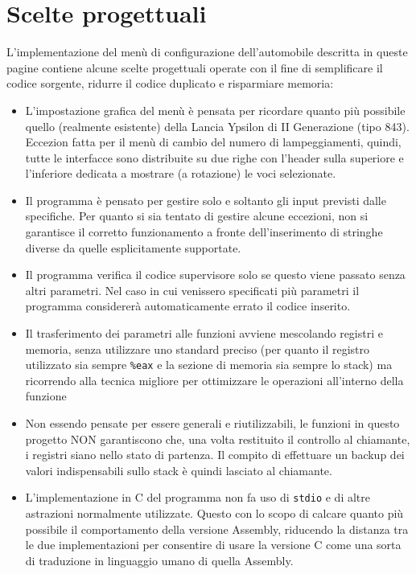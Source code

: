 \documentclass[
  12pt,
  a4paper,
  headings=optiontoheadandtoc
]{scrreprt}
\begin{document}
\chapter[nonumber=true]{Scelte progettuali}

L'implementazione del menù di configurazione dell'automobile descritta in queste pagine contiene alcune scelte progettuali operate con il fine di semplificare il codice sorgente, ridurre il codice duplicato e risparmiare memoria:

\begin{itemize}
\item L'impostazione grafica del menù è pensata per ricordare quanto più possibile quello (realmente esistente) della Lancia Ypsilon di II Generazione (tipo 843). Eccezion fatta per il menù di cambio del numero di lampeggiamenti, quindi, tutte le interfacce sono distribuite su due righe con l'header sulla superiore e l'inferiore dedicata a mostrare (a rotazione) le voci selezionate.
\item Il programma è pensato per gestire solo e soltanto gli input previsti dalle specifiche. Per quanto si sia tentato di gestire alcune eccezioni, non si garantisce il corretto funzionamento a fronte dell'inserimento di stringhe diverse da quelle esplicitamente supportate.
\item Il programma verifica il codice supervisore solo se questo viene passato senza altri parametri. Nel caso in cui venissero specificati più parametri il programma considererà automaticamente errato il codice inserito.
\item Il trasferimento dei parametri alle funzioni avviene mescolando registri e memoria, senza utilizzare uno standard preciso (per quanto il registro utilizzato sia sempre \texttt{\%eax} e la sezione di memoria sia sempre lo stack) ma ricorrendo alla tecnica migliore per ottimizzare le operazioni all'interno della funzione
\item Non essendo pensate per essere generali e riutilizzabili, le funzioni in questo progetto NON garantiscono che, una volta restituito il controllo al chiamante, i registri siano nello stato di partenza. Il compito di effettuare un backup dei valori indispensabili sullo stack è quindi lasciato al chiamante.
\item L'implementazione in C del programma non fa uso di \texttt{stdio} e di altre astrazioni normalmente utilizzate. Questo con lo scopo di calcare quanto più possibile il comportamento della versione Assembly, riducendo la distanza tra le due implementazioni per consentire di usare la versione C come una sorta di traduzione in linguaggio umano di quella Assembly.
\end{itemize}
\end{document}
